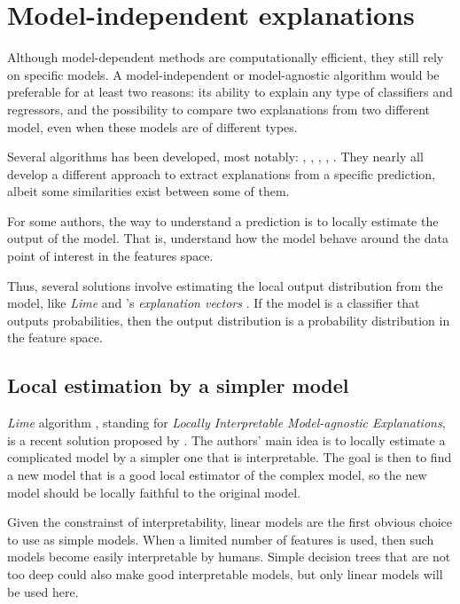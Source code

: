 \documentclass[a4paper,11pt]{kth-mag}
\begin{document}
\section{Model-independent explanations}

Although model-dependent methods are computationally efficient, they still rely on specific models. A model-independent or model-agnostic algorithm would be preferable for at least two reasons: its ability to explain any type of classifiers and regressors, and the possibility to compare two explanations from two different model, even when these models are of different types.

Several algorithms has been developed, most notably: \cite{lime}, \cite{explvect}, \cite{ice}, \cite{gametheory}, \cite{documentclassif}. They nearly all develop a different approach to extract explanations from a specific prediction, albeit some similarities exist between some of them.

For some authors, the way to understand a prediction is to locally estimate the output of the model. That is, understand how the model behave around the data point of interest in the features space.

Thus, several solutions involve estimating the local output distribution from the model, like \textit{Lime} \cite{lime} and \citeauthor{explvect}'s \textit{explanation vectors} \cite{explvect}. If the model is a classifier that outputs probabilities, then the output distribution is a probability distribution in the feature space. 

\subsection{Local estimation by a simpler model}

\textit{Lime} algorithm \cite{lime}, standing for \textit{Locally Interpretable Model-agnostic Explanations}, is a recent solution proposed by \citeauthor{lime}. The authors' main idea is to locally estimate a complicated model by a simpler one that is interpretable. The goal is then to find a new model that is a good local estimator of the complex model, so the new model should be locally faithful to the original model.

Given the constrainst of interpretability, linear models are the first obvious choice to use as simple models. When a limited number of features is used, then such models become easily interpretable by humans. Simple decision trees that are not too deep could also make good interpretable models, but only linear models will be used here.
\end{document}
